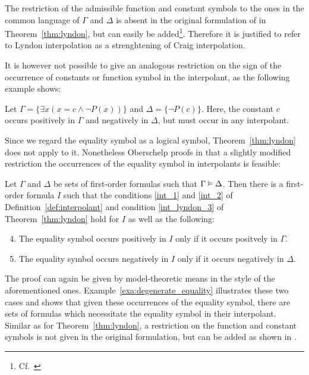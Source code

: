 The restriction of the admissible function and constant symbols to the ones in the common language of $\Gamma$ and $\Delta$ is absent in the original formulation of in Theorem~\ref{thm:lyndon}, but can easily be added\footnote{Cf.\ \cite{motohashi84}}.
Therefore it is justified to refer to Lyndon interpolation as a strenghtening of Craig interpolation.

It is however not possible to give an analogous restriction on the sign of the occurrence of constants or function symbol in the interpolant, as the following example shows: 

\begin{exa}
	Let $\Gamma = \{ \exists x ( x = c \land \lnot P(x)) \}$ and $\Delta = \{ \lnot P(c) \}$.
	Here, the constant $c$ occurs positively in $\Gamma$ and negatively in $\Delta$, but must occur in any interpolant.
\end{exa}

Since we regard the equality symbol as a logical symbol, Theorem~\ref{thm:lyndon} does not apply to it.
Nonetheless
Oberschelp proofs in \cite{oberschelp68} that a slightly modified restriction the occurrences of the equality symbol in interpolants is feasible:

\begin{thm}[Oberschelp]
	\label{thm:oberschelp}
	Let $\Gamma$ and $\Delta$ be sets of first-order formulas such that $\Gamma \entails\nolinebreak \Delta$. 
	Then there is a first-order formula $I$ such that the conditions \ref{int_1} and \ref{int_2} of Definition~\ref{def:interpolant} and condition \ref{int_lyndon_3} of Theorem~\ref{thm:lyndon} hold for $I$ as well as the following:

	\begin{enumerate}%
		\setcounter{enumi}{3}
		\item 
			The equality symbol occurs positively in $I$ only if it occurs positvely in $\Gamma$.
		\item
			The equality symbol occurs negatively in $I$ only if it occurs negatively in $\Delta$.
	\end{enumerate}
\end{thm}

The proof can again be given by model-theoretic means in the style of the aforementioned ones.
Example~\ref{exa:degenerate_equality} illustrates these two cases and shows that given these occurrences of the equality symbol, there are sets of formulas which necessitate the equality symbol in their interpolant.
Similar as for Theorem~\ref{thm:lyndon}, a restriction on the function and constant symbols is not given in the original formulation, but can be added as shown in \cite{fujiwara78}.


